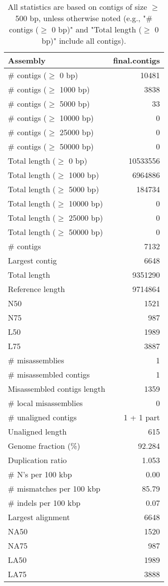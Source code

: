 \documentclass[12pt,a4paper]{article}
\begin{document}
\begin{table}[ht]
\begin{center}
\caption{All statistics are based on contigs of size $\geq$ 500 bp, unless otherwise noted (e.g., "\# contigs ($\geq$ 0 bp)" and "Total length ($\geq$ 0 bp)" include all contigs).}
\begin{tabular}{|l*{1}{|r}|}
\hline
Assembly & final.contigs \\ \hline
\# contigs ($\geq$ 0 bp) & 10481 \\ \hline
\# contigs ($\geq$ 1000 bp) & 3838 \\ \hline
\# contigs ($\geq$ 5000 bp) & 33 \\ \hline
\# contigs ($\geq$ 10000 bp) & 0 \\ \hline
\# contigs ($\geq$ 25000 bp) & 0 \\ \hline
\# contigs ($\geq$ 50000 bp) & 0 \\ \hline
Total length ($\geq$ 0 bp) & 10533556 \\ \hline
Total length ($\geq$ 1000 bp) & 6964886 \\ \hline
Total length ($\geq$ 5000 bp) & 184734 \\ \hline
Total length ($\geq$ 10000 bp) & 0 \\ \hline
Total length ($\geq$ 25000 bp) & 0 \\ \hline
Total length ($\geq$ 50000 bp) & 0 \\ \hline
\# contigs & 7132 \\ \hline
Largest contig & 6648 \\ \hline
Total length & 9351290 \\ \hline
Reference length & 9714864 \\ \hline
N50 & 1521 \\ \hline
N75 & 987 \\ \hline
L50 & 1989 \\ \hline
L75 & 3887 \\ \hline
\# misassemblies & 1 \\ \hline
\# misassembled contigs & 1 \\ \hline
Misassembled contigs length & 1359 \\ \hline
\# local misassemblies & 0 \\ \hline
\# unaligned contigs & 1 + 1 part \\ \hline
Unaligned length & 615 \\ \hline
Genome fraction (\%) & 92.284 \\ \hline
Duplication ratio & 1.053 \\ \hline
\# N's per 100 kbp & 0.00 \\ \hline
\# mismatches per 100 kbp & 85.79 \\ \hline
\# indels per 100 kbp & 0.07 \\ \hline
Largest alignment & 6648 \\ \hline
NA50 & 1520 \\ \hline
NA75 & 987 \\ \hline
LA50 & 1989 \\ \hline
LA75 & 3888 \\ \hline
\end{tabular}
\end{center}
\end{table}
\end{document}
